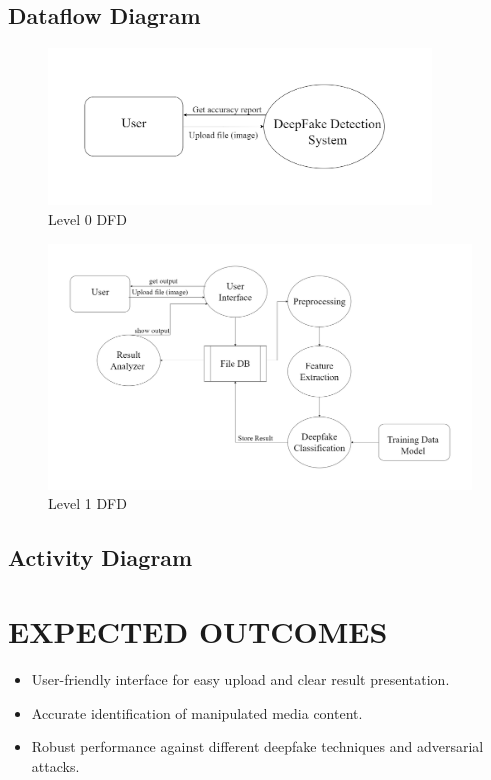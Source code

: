 \documentclass[12 pt]{article}
\begin{document}
\subsection{Dataflow Diagram}
\begin{figure}[h]
    \centering
    \includegraphics[width= 4in ]{level0dfd.drawio.png}
    \caption{Level 0 DFD}
\end{figure}\begin{figure}[h]
    \centering
    \includegraphics[width= 5in ]{level1dfd.drawio.png}
    \caption{Level 1 DFD}
\end{figure}
\newpage
\subsection{Activity Diagram}
\newpage


\section{EXPECTED OUTCOMES}
\begin{itemize}
    \item User-friendly interface for easy upload and clear result presentation.
    \item Accurate identification of manipulated media content.
    \item Robust performance against different deepfake techniques and adversarial attacks.
\end{itemize}
\newpage
\end{document}
